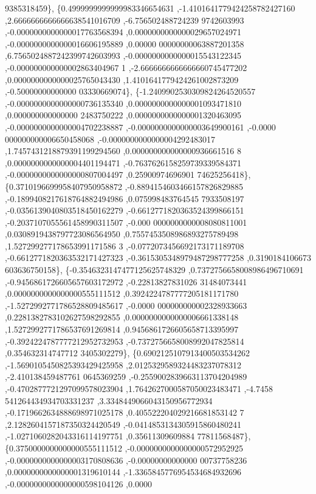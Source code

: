 \begin{DoxyCode}
      9385318459\},
\{0.4999999999999983346654631 ,-1.4101641779424258782427160 ,2.6666666666666638541016709 ,-6.756502488724239
      9742603993 ,-0.0000000000000017763568394 ,0.0000000000000029657024971 ,-0.0000000000000016606195889 ,0.00000
      00000000063887201358 ,6.7565024887242399742603993 ,-0.0000000000000015543122345 ,-0.000000000000002863404967
      1 ,-2.6666666666666660745477202 ,0.0000000000000025765043430 ,1.4101641779424261002873209 ,-0.50000000000000
      03330669074\},
\{-1.2409902530309824264520557 ,-0.0000000000000000736135340 ,0.0000000000000001093471810 ,0.000000000000000
      2483750222 ,0.0000000000000001320463095 ,-0.0000000000000004702238887 ,-0.0000000000000003649900161 ,-0.0000
      000000000006650458068 ,-0.0000000000000004292483017 ,1.7457431218879391199294560 ,0.000000000000000936661516
      8 ,0.0000000000000004401194471 ,-0.7637626158259739339584371 ,-0.0000000000000000807004497 ,0.25900974696901
      74625256418\},
\{0.3710196699958407950958872 ,-0.8894154603466157826829885 ,-0.1899408217618764882494986 ,0.075998483764545
      7933508197 ,-0.0356139040803518450162279 ,-0.6612771820363524399866151 ,-0.2037107055561458990311507 ,-0.000
      0000000000008080811001 ,0.0308919438797723086564950 ,0.7557453508986893275789498 ,1.527299277178653991171586
      3 ,-0.0772073456692173171189708 ,-0.6612771820363532171427323 ,-0.3615305348979487298777258 ,0.3190184106673
      603636750158\},
\{-0.3546323147477125625748329 ,0.7372756658008986496710691 ,-0.9456861726605657603172972 ,-0.22813827831026
      31484073441 ,0.0000000000000000555111512 ,0.3924224787777205181171780 ,-1.5272992771786528809485617 ,-0.0000
      000000000002328933663 ,0.2281382783102627598292855 ,0.0000000000000006661338148 ,1.5272992771786537691269814
       ,0.9456861726605658713395997 ,-0.3924224787777212952732953 ,-0.7372756658008992047825814 ,0.354632314747712
      3405302279\},
\{0.6902125107913400503534262 ,-1.5690105450825393429425958 ,2.0125329589324483237078312 ,-2.410138459487761
      0645369259 ,-0.2559002839663113704204989 ,-0.4702877721297099578023904 ,1.7642627000587050023483471 ,-4.7458
      541264434934703331237 ,3.3348449066043150956772934 ,-0.1719662634888698971025178 ,0.405522204029216681853142
      7 ,2.1282604157187350324420549 ,-0.0414853134305915860480241 ,-1.0271060282043316114197751 ,0.35611309609884
      77811568487\},
\{0.3750000000000000555111512 ,-0.0000000000000000572952925 ,-0.0000000000000003170808636 ,-0.00000000000000
      00737758236 ,0.0000000000000001319610144 ,-1.3365845776954534684932696 ,-0.0000000000000000598104126 ,0.0000

\end{DoxyCode}
